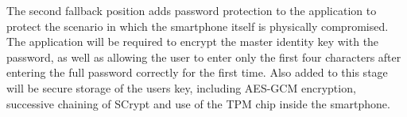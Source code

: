 The second fallback position adds password protection to the application to protect the scenario in which the smartphone itself is physically compromised. The application will be required to encrypt the master identity key with the password, as well as allowing the user to enter only the first four characters after entering the full password correctly for the first time. Also added to this stage will be secure storage of the users key, including AES-GCM encryption, successive chaining of SCrypt and use of the TPM chip inside the smartphone.
